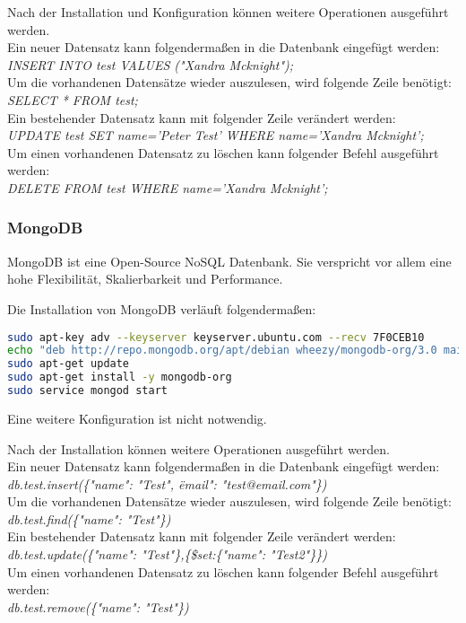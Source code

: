 Nach der Installation und Konfiguration können weitere Operationen ausgeführt werden.\\
Ein neuer Datensatz kann folgendermaßen in die Datenbank eingefügt werden:\\
\textit{INSERT INTO test VALUES ("Xandra Mcknight");}\\
Um die vorhandenen Datensätze wieder auszulesen, wird folgende Zeile benötigt:\\
\textit{SELECT * FROM test;}\\
Ein bestehender Datensatz kann mit folgender Zeile verändert werden:\\
\textit{UPDATE test SET name='Peter Test' WHERE name='Xandra Mcknight';}\\
Um einen vorhandenen Datensatz zu löschen kann folgender Befehl ausgeführt werden:\\
\textit{DELETE FROM test WHERE name='Xandra Mcknight';}

\subsubsection{MongoDB}
MongoDB ist eine Open-Source NoSQL Datenbank. Sie verspricht vor allem eine hohe Flexibilität, Skalierbarkeit und Performance. \cite{ABOUTMONGODB}

Die Installation von MongoDB verläuft folgendermaßen:
\begin{lstlisting}[caption=Installation von MongoDB \cite{MONGODBINSTALL}, language=bash]
sudo apt-key adv --keyserver keyserver.ubuntu.com --recv 7F0CEB10
echo "deb http://repo.mongodb.org/apt/debian wheezy/mongodb-org/3.0 main" | sudo tee /etc/apt/sources.list.d/mongodb-org-3.0.list
sudo apt-get update
sudo apt-get install -y mongodb-org
sudo service mongod start
\end{lstlisting}
Eine weitere Konfiguration ist nicht notwendig.

Nach der Installation können weitere Operationen ausgeführt werden.\\
Ein neuer Datensatz kann folgendermaßen in die Datenbank eingefügt werden:\\
\textit{db.test.insert(\{"name": "Test", \"email": "test@email.com"\})}\\
Um die vorhandenen Datensätze wieder auszulesen, wird folgende Zeile benötigt:\\
\textit{db.test.find(\{"name": "Test"\})}\\
Ein bestehender Datensatz kann mit folgender Zeile verändert werden:\\
\textit{db.test.update(\{"name": "Test"\},\{\$set:\{"name": "Test2"\}\})}\\
Um einen vorhandenen Datensatz zu löschen kann folgender Befehl ausgeführt werden:\\
\textit{db.test.remove(\{"name": "Test"\})}

